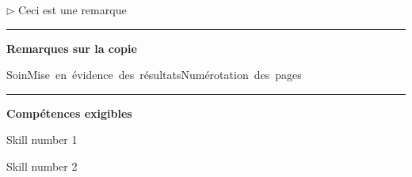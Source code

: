 \documentclass[12pt, a4paper]{article}
\begin{document}
$\triangleright$\xspace Ceci est une remarque


\noindent\rule{\linewidth}{.7pt}\begin{center}{\large\bf Remarques sur la copie}\end{center}

\begin{center}
\noindent \mbox{Soin\xspace\xspace\color{DarkOrange}\faMehO\color{black}}\hfill \mbox{Mise en évidence des résultats\xspace\xspace\color{DarkGreen}\faSmileO\color{black}}\hfill \mbox{Numérotation des pages\xspace\xspace\color{DarkRed}\faFrownO\color{black}}\hfill 
\end{center}


\noindent\rule{\linewidth}{.7pt}\begin{center}{\large\bf Compétences exigibles}\end{center}

\begin{minipage}[c]{0.4\linewidth}\centering
Skill number 1\xspace\xspace\color{DarkOrange}\faMehO\color{black}
\end{minipage}\hfill
\begin{minipage}[c]{0.4\linewidth}\centering
Skill number 2\xspace\xspace\color{DarkRed}\faFrownO\color{black}
\end{minipage}
\end{document}

